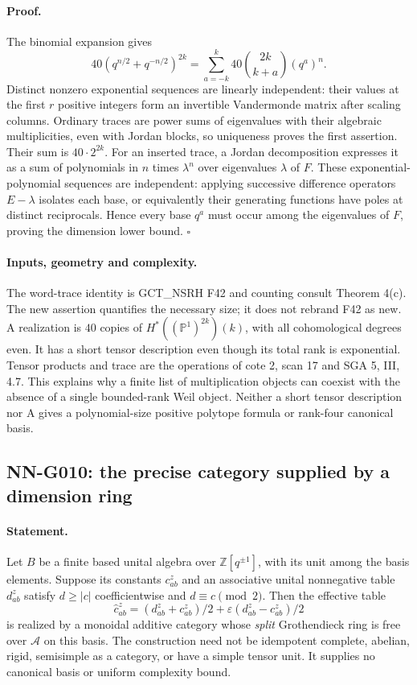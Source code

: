 \paragraph{Proof.}
The binomial expansion gives
\[
 40(q^{n/2}+q^{-n/2})^{2k}
 =\sum_{a=-k}^k40\binom{2k}{k+a}(q^a)^n.
\]
Distinct nonzero exponential sequences are linearly independent:
their values at the first $r$ positive integers form an invertible
Vandermonde matrix after scaling columns. Ordinary traces are
power sums of eigenvalues with their algebraic multiplicities,
even with Jordan blocks, so uniqueness proves the first assertion.
Their sum is $40\cdot2^{2k}$. For an inserted trace, a Jordan
decomposition expresses it as a sum of polynomials in $n$ times
$\lambda^n$ over eigenvalues $\lambda$ of $F$. These
exponential-polynomial sequences are independent: applying
successive difference operators $E-\lambda$ isolates each
base, or equivalently their generating functions have poles at
distinct reciprocals. Hence every base $q^a$ must occur among
the eigenvalues of $F$, proving the dimension lower bound.
\hfill$\square$

\paragraph{Inputs, geometry and complexity.}
The word-trace identity is GCT\_NSRH F42 and counting consult
Theorem 4(c). The new assertion quantifies the necessary size;
it does not rebrand F42 as new. A realization is $40$ copies of
$H^*((\mathbb P^1)^{2k})(k)$, with all cohomological degrees even.
It has a short tensor description even though its total rank is
exponential. Tensor products and trace are the operations of
cote 2, scan 17 and SGA 5, III, 4.7. This explains why a finite
list of multiplication objects can coexist with the absence of
a single bounded-rank Weil object. Neither a short tensor
description nor A gives a polynomial-size positive polytope
formula or rank-four canonical basis.

\subsection{NN-G010: the precise category supplied by a dimension ring}
\paragraph{Statement.}
Let $B$ be a finite based unital algebra over
$\mathbb Z[q^{\pm1}]$, with its unit among the basis elements.
Suppose its constants $c_{ab}^z$ and an associative unital
nonnegative table $d_{ab}^z$ satisfy
$d\ge|c|$ coefficientwise and $d\equiv c\pmod2$.
Then the effective table
\[
 \widehat c_{ab}^z=(d_{ab}^z+c_{ab}^z)/2
                +\varepsilon(d_{ab}^z-c_{ab}^z)/2
 \tag{G010.1}
\]
is realized by a monoidal additive category whose \emph{split}
Grothendieck ring is free over $\mathcal A$ on this basis. The
construction need not be idempotent complete, abelian, rigid,
semisimple as a category, or have a simple tensor unit. It
supplies no canonical basis or uniform complexity bound.


